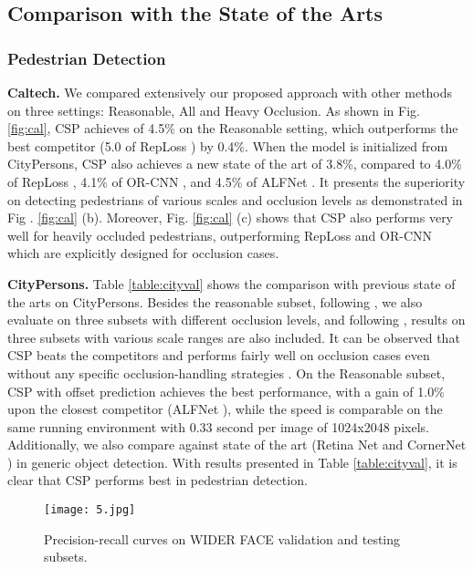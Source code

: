 \subsection{Comparison with the State of the Arts}
\subsubsection{Pedestrian Detection}
\textbf{Caltech.}
We compared extensively our proposed approach with other methods on three settings: Reasonable, All and Heavy Occlusion.
As shown in Fig. \ref{fig:cal}, CSP achieves  of 4.5\% on the Reasonable setting, which outperforms the best competitor (5.0 of RepLoss \cite{wang2017repulsion}) by 0.4\%. When the model is initialized from CityPersons\cite{zhang2017citypersons}, CSP also achieves a new state of the art of 3.8\%, compared to 4.0\% of RepLoss \cite{wang2017repulsion}, 4.1\% of OR-CNN \cite{Zhang_2018_ECCV}, and 4.5\% of ALFNet \cite{Liu_2018_ECCV}. It presents the superiority on detecting pedestrians of various scales and occlusion levels as demonstrated in Fig . \ref{fig:cal} (b). Moreover, Fig. \ref{fig:cal} (c) shows that CSP also performs very well for heavily occluded pedestrians, outperforming RepLoss \cite{wang2017repulsion} and OR-CNN \cite{Zhang_2018_ECCV} which are explicitly designed for occlusion cases.

\textbf{CityPersons.}
Table \ref{table:cityval} shows the comparison with previous state of the arts on CityPersons.
Besides the reasonable subset, following \cite{wang2017repulsion}, we also evaluate on three subsets with different occlusion levels, and following \cite{zhang2017citypersons}, results on three subsets with various scale ranges are also included. It can be observed that CSP beats the competitors and performs fairly well on occlusion cases even without any specific occlusion-handling strategies \cite{wang2017repulsion,Zhang_2018_ECCV}.
On the Reasonable subset, CSP with offset prediction achieves the best performance, with a gain of 1.0\%  upon the closest competitor (ALFNet \cite{Liu_2018_ECCV}), while the speed is comparable on the same running environment with 0.33 second per image of 1024x2048 pixels. Additionally, we also compare against state of the art (Retina Net \cite{lin2017focal} and CornerNet \cite{Law_2018_ECCV}) in generic object detection. With results presented in Table \ref{table:cityval}, it is clear that CSP performs best in pedestrian detection.

\begin{figure*}[t]
\begin{center}
\texttt{[image: 5.jpg]}
\end{center}
   \caption{Precision-recall curves on WIDER FACE validation and testing subsets.}
\label{fig:wider}
\end{figure*}

